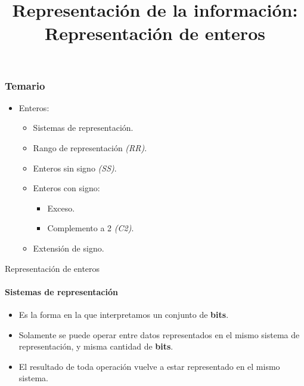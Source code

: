 \documentclass[11pt,a4paper,spanish]{beamer}
\title{Representación de la información:\\
Representación de enteros}
\author{}
\date{}
\begin{document}
\begin{frame}[noframenumbering]


    \maketitle
    \centering

\end{frame}

\begin{frame}[label=temario]

    \frametitle{Temario}

\begin{itemize}
    \item Enteros:
    \begin{itemize}
        \item Sistemas de representación.
        \item Rango de representación \emph{(RR)}.
        \item Enteros sin signo \emph{(SS)}.
        \item Enteros con signo:
        \begin{itemize}
            \item Exceso.
            \item Complemento a 2 \emph{(C2)}.
        \end{itemize}
        \item Extensión de signo.
    \end{itemize}
\end{itemize}
\end{frame}

\begin{frame}{Representación de enteros}
    \framesubtitle{Sistemas de representación}

    \begin{itemize}
        \item Es la forma en la que interpretamos un conjunto de
            \textbf{bits}.
        \item Solamente se puede operar entre datos representados en el mismo
            sistema de representación, y misma cantidad de \textbf{bits}.
        \item El resultado de toda operación vuelve a estar representado en el
            mismo sistema.
    \end{itemize}

\end{frame}
\end{document}
